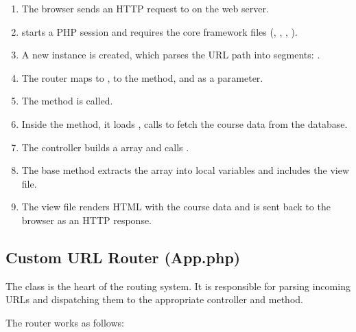 \documentclass[12pt,a4paper]{report}
\begin{document}
\begin{enumerate}
    \item The browser sends an HTTP request to  on the web server.
    \item {} starts a PHP session and requires the core framework files (, , , ).
    \item A new  instance is created, which parses the URL path into segments: .
    \item The router maps  to ,  to the  method, and  as a parameter.
    \item The  method is called.
    \item Inside the method, it loads , calls  to fetch the course data from the database.
    \item The controller builds a  array and calls .
    \item The base  method extracts the  array into local variables and includes the view file.
    \item The view file renders HTML with the course data and is sent back to the browser as an HTTP response.
\end{enumerate}

\subsection{Custom URL Router (App.php)}

The  class is the heart of the routing system. It is responsible for parsing incoming URLs and dispatching them to the appropriate controller and method.

The router works as follows:
\end{document}
